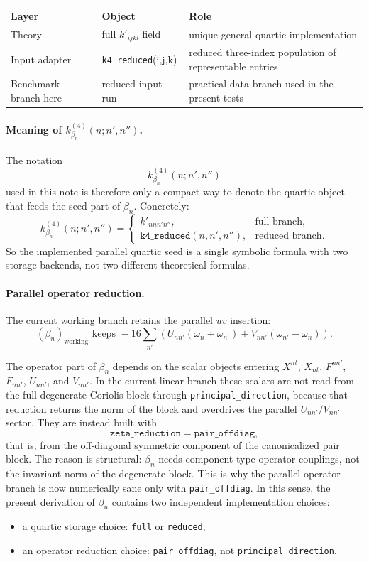 \documentclass[11pt]{article}
\begin{document}
\begin{center}
\begin{tabular}{lll}
\toprule
Layer & Object & Role \\
\midrule
Theory & full $k'_{ijkl}$ field & unique general quartic implementation \\
Input adapter & \texttt{k4\_reduced}(i,j,k) & reduced three-index population of representable entries \\
Benchmark branch here & reduced-input run & practical data branch used in the present tests \\
\bottomrule
\end{tabular}
\end{center}

\paragraph{Meaning of $k^{(4)}_{\beta_n}(n;n',n'')$.}
The notation
\[
k^{(4)}_{\beta_n}(n;n',n'')
\]
used in this note is therefore only a compact way to denote the quartic object
that feeds the seed part of $\beta_n$. Concretely:
\[
k^{(4)}_{\beta_n}(n;n',n'')=
\begin{cases}
k'_{nnn'n''}, & \text{full branch},\\[0.4em]
\texttt{k4\_reduced}(n,n',n''), & \text{reduced branch}.
\end{cases}
\]
So the implemented parallel quartic seed is a single symbolic formula with two
storage backends, not two different theoretical formulas.

\paragraph{Parallel operator reduction.}
\label{sec:beta-n-operator-reduction}
The current working branch retains the parallel $uv$ insertion:
\[
(\beta_n)_{\mathrm{working}}
\text{ keeps }
-16\sum_{n'}
\left( U_{nn'}(\omega_n+\omega_{n'}) + V_{nn'}(\omega_{n'}-\omega_n)\right).
\]

The operator part of $\beta_n$ depends on the scalar objects entering
$X^{nt}$, $X_{nt}$, $F^{nn'}$, $F_{nn'}$, $U_{nn'}$, and $V_{nn'}$. In the
current linear branch these scalars are not read from the full degenerate
Coriolis block through \texttt{principal\_direction}, because that reduction
returns the norm of the block and overdrives the parallel $U_{nn'}/V_{nn'}$
sector. They are instead built with
\[
\texttt{zeta\_reduction}=\texttt{pair\_offdiag},
\]
that is, from the off-diagonal symmetric component of the canonicalized pair
block. The reason is structural: $\beta_n$ needs component-type operator
couplings, not the invariant norm of the degenerate block. This is why the
parallel operator branch is now numerically sane only with
\texttt{pair\_offdiag}. In this sense, the present derivation of $\beta_n$
contains two independent implementation choices:
\begin{itemize}
\item a quartic storage choice: \texttt{full} or \texttt{reduced};
\item an operator reduction choice: \texttt{pair\_offdiag}, not
\texttt{principal\_direction}.
\end{itemize}
\end{document}
